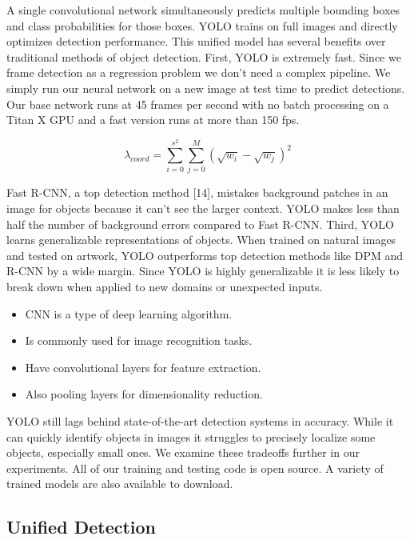 \documentclass[12pt,a4paper]{article}
\begin{document}
A single convolutional network simultaneously predicts multiple bounding boxes and class probabilities for those boxes. YOLO trains on full images and directly optimizes detection performance. This unified model has several benefits over traditional methods of object detection. First, YOLO is extremely fast. Since we frame detection as a regression problem we don’t need a complex pipeline. We simply run our neural network on a new image at test time to predict detections. Our base network runs at 45 frames per second with no batch processing on a Titan X GPU and a fast version runs at more than 150 fps. 

\begin{equation}
\label{eq1}
    \lambda_{coord} = \sum_{i = 0}^{s^{2}} \sum_{j = 0}^{M} (\sqrt{w_{i}} - \sqrt{w_{j}})^{2}
\end{equation}

Fast R-CNN, a top detection method [14], mistakes background patches in an image for objects because it can’t see the larger context. YOLO makes less than half the number of background errors compared to Fast R-CNN. Third, YOLO learns generalizable representations of objects. When trained on natural images and tested on artwork, YOLO outperforms top detection methods like DPM and R-CNN by a wide margin. Since YOLO is highly generalizable it is less likely to break down when applied to new domains or unexpected inputs. 

\begin{itemize}
    \item CNN is a type of deep learning algorithm.
    \item Is commonly used for image recognition tasks.
    \item Have convolutional layers for feature extraction.
    \item Also pooling layers for dimensionality reduction.

\end{itemize}

YOLO still lags behind state-of-the-art detection systems in accuracy. While it can quickly identify objects in images it struggles to precisely localize some objects, especially small ones. We examine these tradeoffs further in our experiments. All of our training and testing code is open source. A variety of trained models are also available to download. 

\subsection{Unified Detection}
\end{document}
